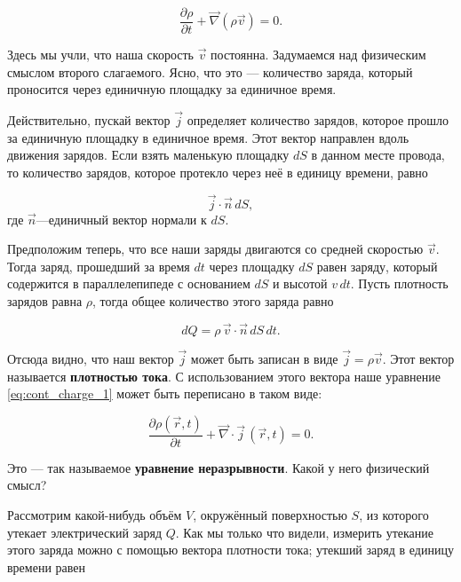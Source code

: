 \documentclass[a4paper,12pt]{article}
\newcommand{\pt}{\partial}
\newcommand{\vn}{\vec{\nabla}}
\begin{document}
\begin{equation}
  \label{eq:cont_charge_1}
  \frac{\pt \rho}{\pt t} + \vn ( \rho \vec{v}) =0.
\end{equation}

Здесь мы учли, что наша скорость $\vec{v}$ постоянна. Задумаемся над
физическим смыслом второго слагаемого. Ясно, что это — количество
заряда, который проносится через единичную площадку за единичное
время. 

Действительно, пускай вектор $\vec{j}$ определяет количество зарядов,
которое прошло за единичную площадку в единичное время. Этот вектор
направлен вдоль движения зарядов. Если взять маленькую площадку $dS$ в
данном месте провода, то количество зарядов, которое протекло через
неё в единицу времени, равно

\begin{equation}
  \label{eq:def_j_1}
  \vec{j} \cdot \vec{n}\, dS,
\end{equation}
где $\vec{n}$---единичный вектор нормали к $dS$. 

Предположим теперь, что все наши заряды двигаются со средней скоростью
$\vec{v}$. Тогда заряд, прошедший за время $dt$ через площадку $dS$
равен заряду, который содержится в параллелепипеде с основанием $dS$ и
высотой $v\, dt$. Пусть плотность зарядов равна $\rho$, тогда общее
количество этого заряда равно

\begin{equation}
  \label{eq:def_j_2}
  dQ = \rho \, \vec{v} \cdot \vec{n} \, dS\, dt.
\end{equation}

Отсюда видно, что наш вектор $\vec{j}$ может быть записан в виде
$\vec{j} = \rho \vec{v}$. Этот вектор называется \textbf{плотностью
  тока}. С использованием этого вектора наше уравнение
\eqref{eq:cont_charge_1} может быть переписано в таком виде: 

\begin{equation}
  \label{eq:cont_charge_2}
  \frac{\pt \rho (\vec{r},t)}{\pt t} + \vn \cdot \vec{j} \,(\vec{r},t)=0.
\end{equation}

Это — так называемое \textbf{уравнение неразрывности}. Какой у него
физический смысл? 

Рассмотрим какой-нибудь объём $V$, окружённый поверхностью $S$, из
которого утекает электрический заряд $Q$. Как мы только что видели,
измерить утекание этого заряда можно с помощью вектора плотности тока;
утекший заряд в единицу времени равен 
\end{document}
